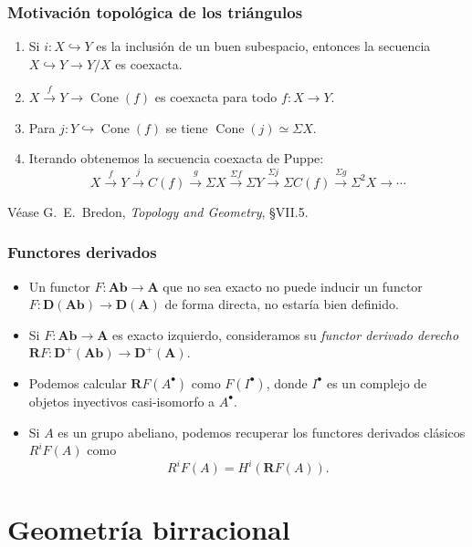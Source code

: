 \documentclass[12pt]{beamer}
\begin{document}
\begin{frame}
  \frametitle{Motivación topológica de los triángulos}
  \begin{enumerate}
    \item Si $i \colon X \hookrightarrow Y$ es la inclusión de un buen subespacio, entonces la secuencia $X \hookrightarrow Y \to Y/X$ es coexacta.
      \pause
    \item $X \xrightarrow{f} Y \to \operatorname{Cone}(f)$ es coexacta para todo $f \colon X \to Y$.
      \pause
    \item Para $j \colon Y \hookrightarrow \operatorname{Cone}(f)$ se tiene $\operatorname{Cone}(j) \simeq \Sigma X$.
      \pause
    \item Iterando obtenemos la secuencia coexacta de Puppe:
      \[ X \xrightarrow{f} Y \xrightarrow{j} C(f) \xrightarrow{g} \Sigma X \xrightarrow{\Sigma f} \Sigma Y \xrightarrow{\Sigma j} \Sigma C(f) \xrightarrow{\Sigma g} \Sigma^{2} X \to \cdots \]
  \end{enumerate}
  Véase G.~E.~Bredon, \textit{Topology and Geometry}, \S VII.5.
\end{frame}

\begin{frame}
  \frametitle{Functores derivados}
  \begin{itemize}
    \item Un functor $F \colon \mathbf{Ab} \to \mathbf{A}$ que no sea exacto no puede inducir un functor $F \colon \mathbf{D}(\mathbf{Ab}) \to \mathbf{D}(\mathbf{A})$ de forma directa, no estaría bien definido.
      \pause
    \item Si $F \colon \mathbf{Ab} \to \mathbf{A}$ es exacto izquierdo, consideramos su \textit{functor derivado derecho} $\mathbf{R}F \colon \mathbf{D}^{+}(\mathbf{Ab}) \to \mathbf{D}^{+}(\mathbf{A})$.
      \pause
    \item Podemos calcular $\mathbf{R}F(A^{\bullet})$ como $F(I^{\bullet})$, donde $I^{\bullet}$ es un complejo de objetos inyectivos casi-isomorfo a $A^{\bullet}$.
      \pause
    \item Si $A$ es un grupo abeliano, podemos recuperar los functores derivados clásicos $R^{i}F(A)$ como
      \[ R^{i}F(A) = H^{i}(\mathbf{R}F(A)). \]
  \end{itemize}
\end{frame}

\section{Geometría birracional}
\end{document}
